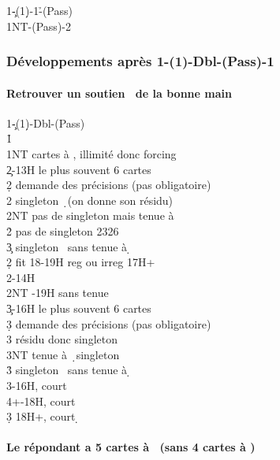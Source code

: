 \documentclass[a4paper]{article}
\begin{document}
\begin{bidtable}
1\c-(1\d)-1\h-(Pass)\\
1NT-(Pass)-2\s
\end{bidtable}

\subsubsection{Développements après 1\pdfc-(1\pdfd)-Dbl-(Pass)-1\pdfh}

\paragraph{Retrouver un soutien \pdfs\ de la bonne main}

\begin{bidtable}
1\c-(1\d)-Dbl-(Pass)\\
1\h\+\\
1NT  cartes à \s , illimité donc forcing\+\\
2\c {}-13H le plus souvent 6 cartes\+\\
2\d \> demande des précisions (pas obligatoire)\+\\
2\s \> singleton \d\ (on donne son résidu)\\
2NT \> pas de singleton mais tenue à \d \\
2\h \> pas de singleton 2326\\
3\c \> singleton \s\ sans tenue à \d \-\-\\
2\d \> fit 18-19H reg ou irreg 17H+\\
2\s {}-14H\\
2NT -19H sans tenue\\
3\c {}-16H le plus souvent 6 cartes\+\\
3\d \> demande des précisions (pas obligatoire)\+\\
3\s \> résidu donc singleton \d \\
3NT \> tenue à \d\ singleton \s \\
3\h \> singleton \s\ sans tenue à \d \-\-\\
3\s {}-16H, court \d \\
4\s {}+-18H, court \d \\
3\d \> 18H+, court \d \-\-
\end{bidtable}

\paragraph{Le répondant a 5 cartes à \pdfh\ (sans 4 cartes à \pdfs)}
\end{document}
